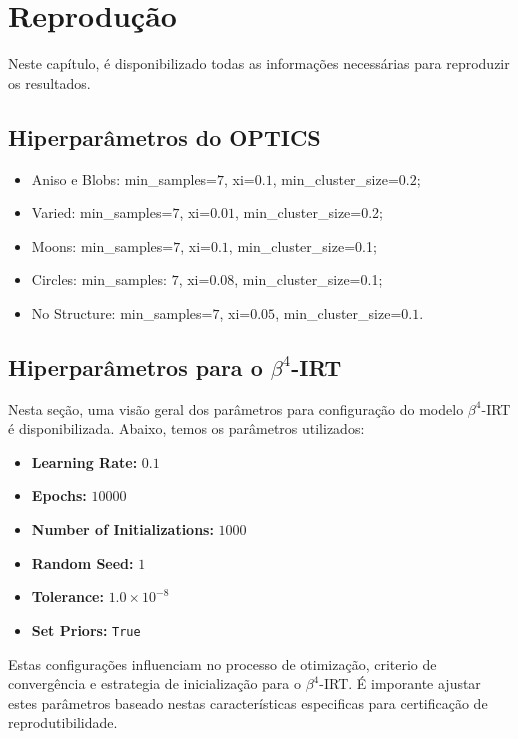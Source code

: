 \chapter{Reprodução}\label{apen:apendiceA}


Neste capítulo, é disponibilizado todas as informações necessárias para reproduzir os resultados.

\section{Hiperparâmetros do OPTICS}

    \begin{itemize}
        \item Aniso e Blobs: min\_samples=$7$, xi=$0.1$, min\_cluster\_size=$0.2$;
        \item Varied: min\_samples=$7$, xi=$0.01$, min\_cluster\_size=0.2;
        \item Moons: min\_samples=$7$, xi=$0.1$, min\_cluster\_size=0.1;
        \item Circles: min\_samples: $7$, xi=$0.08$, min\_cluster\_size=0.1;
        \item No Structure: min\_samples=$7$, xi=$0.05$, min\_cluster\_size=$0.1$.
    \end{itemize}  

\section{Hiperparâmetros para o $\beta^{4}$-\gls{IRT}}

Nesta seção, uma visão geral dos parâmetros para configuração do modelo $\beta^{4}$-\gls{IRT} é disponibilizada. Abaixo, temos os parâmetros utilizados:
\begin{itemize}
    \item \textbf{Learning Rate:} $0.1$
    \item \textbf{Epochs:} $10000$
    \item \textbf{Number of Initializations:} $1000$
    \item \textbf{Random Seed:} $1$
    \item \textbf{Tolerance:} $1.0 \times 10^{-8}$
    \item \textbf{Set Priors:} \texttt{True}
\end{itemize}

Estas configurações influenciam no processo de otimização, criterio de convergência e estrategia de inicialização para o $\beta^4$-\gls{IRT}. É imporante ajustar estes parâmetros baseado nestas características  especificas para certificação de reprodutibilidade.


